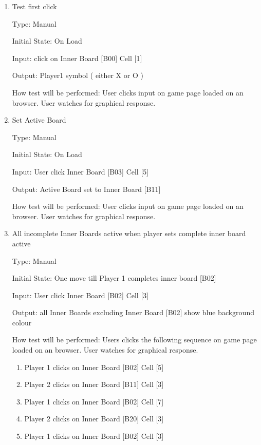 \documentclass[12pt, titlepage]{article}
\begin{document}
\begin{enumerate}

\item{Test first click\\}

Type: Manual
					
Initial State: On Load
					
Input: click on Inner Board [B00] Cell [1] 
					
Output: Player1 symbol ( either X or O )
					
How test will be performed: User clicks input on game page loaded on an browser. User watches for graphical response.

\item{Set Active Board\\}

Type: Manual
					
Initial State: On Load
					
Input: User click Inner Board [B03] Cell [5] 
					
Output:  Active Board set to Inner Board [B11]
					
How test will be performed: User clicks input on game page loaded on an browser. User watches for graphical response. 

\item{All incomplete Inner Boards active when player sets complete inner board active \\}

Type: Manual
					
Initial State: One move till Player 1 completes inner board [B02]
					
Input: User click Inner Board [B02] Cell [3] 
					
Output:  all Inner Boards excluding Inner Board [B02] show blue background colour
					
How test will be performed: Users clicks the following sequence on game page loaded on an browser. User watches for graphical response.
\begin{enumerate}
	\item Player 1 clicks on Inner Board [B02] Cell [5]
	\item Player 2 clicks on Inner Board [B11] Cell [3]
	\item Player 1 clicks on Inner Board [B02] Cell [7]
	\item Player 2 clicks on Inner Board [B20] Cell [3]
	\item Player 1 clicks on Inner Board [B02] Cell [3]
\end{enumerate}


\end{enumerate}
\end{document}
